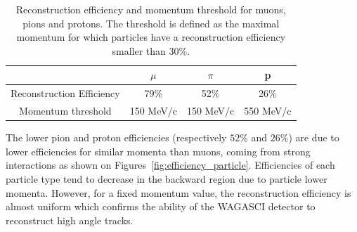 \begin{table}[htb]
  \small
  \begin{center}
    \begin{tabular}{|c|c|c|c|}
      \hline
      \hline
      & $\mu$ & $\pi$ & p \\
      \hline
      Reconstruction Efficiency & 79\% & 52\% & 26\% \\
      Momentum threshold & 150 MeV/c & 150 MeV/c & 550 MeV/c \\
      \hline
      \hline
    \end{tabular}
    \caption{\label{tab:reconstructedparticles} Reconstruction efficiency and momentum threshold for muons, pions and protons. The threshold is defined as the maximal momentum for which particles have a reconstruction efficiency smaller than $30\%$.}
  \end{center}
\end{table}
 The lower pion and proton efficiencies (respectively $52\%$ and $26\%$) are due to lower efficiencies for similar momenta than muons, coming from strong interactions as shown on Figures~\ref{fig:efficiency_particle}. Efficiencies of each particle type tend to decrease in the backward region due to particle lower momenta. However, for a fixed momentum value, the reconstruction efficiency is almost uniform which confirms the ability of the WAGASCI detector to reconstruct high angle tracks. 
